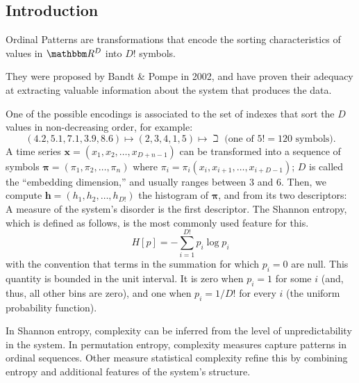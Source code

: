 \documentclass[a0,portrait]{a0poster}
\begin{document}
\begin{mdframed}[style=MyFrame]

\begin{multicols}{2} %



\section{Introduction}

Ordinal Patterns are transformations that encode the sorting characteristics of values in $\mathbbm R^D$ into $D!$ symbols.

They were proposed by Bandt \& Pompe in 2002, and have proven their adequacy at extracting valuable information about the system that produces the data.

One of the possible encodings is associated to the set of indexes that sort the $D$ values in non-decreasing order, for example:
$$
(4.2, 5.1, 7.1, 3.9, 8.6) \longmapsto (2, 3, 4, 1, 5) \longmapsto \beth \text{ (one of }5!=120 \text{ symbols)}.
$$
A time series $\bm x = (x_1,x_2,\dots,x_{D+n-1})$ can be transformed into a sequence of symbols $\bm \pi=(\pi_1,\pi_2,\dots,\pi_n)$ where $\pi_i=\pi_i(x_i,x_{i+1},\dots, x_{i+D-1})$; $D$ is called the ``embedding dimension,'' and usually ranges between $3$ and $6$.
Then, we compute $\bm h =(h_1,h_2,\dots,h_{D!})$ the histogram of $\bm \pi$, and from its two descriptors:
A measure of the system's disorder is the first descriptor. The Shannon entropy, which is defined as follows, is the most commonly used feature for this.
\begin{equation}
    H[p]=-\sum_{i=1}^{D!}{p_i \log p_i}
\end{equation}
with the convention that terms in the summation for which $p_i=0$ are null. This quantity is bounded in the unit interval. It is zero when $p_i=1$ for some $i$ (and, thus, all other bins are zero), and one when $p_i=1/D!$ for every $i$ (the uniform probability function). 

In Shannon entropy, complexity can be inferred from the level of unpredictability in the system. In permutation entropy, complexity measures capture patterns in ordinal sequences. Other measure statistical complexity refine this by combining entropy and additional features of the system’s structure.


\end{multicols}
\end{mdframed}
\end{document}
